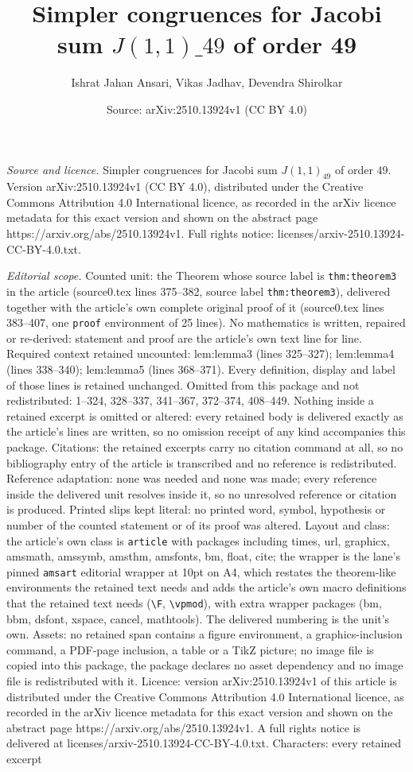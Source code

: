\documentclass[10pt,a4paper]{amsart}
\title[Simpler congruences for Jacobi sum $J(1, 1)\_{49}$ of order 4]{Simpler congruences for Jacobi sum $J(1, 1)\_{49}$ of order 49}
\author{Ishrat Jahan Ansari, Vikas Jadhav, Devendra Shirolkar}
\date{Source: arXiv:2510.13924v1 (CC BY 4.0)}
\begin{document}
\maketitle

\noindent\emph{Source and licence.} Simpler congruences for Jacobi sum $J(1, 1)_{49}$ of order 49. Version arXiv:2510.13924v1 (CC BY 4.0), distributed under the Creative Commons Attribution 4.0 International licence, as recorded in the arXiv licence metadata for this exact version and shown on the abstract page https://arxiv.org/abs/2510.13924v1. Full rights notice: licenses/arxiv-2510.13924-CC-BY-4.0.txt.\par\smallskip

\noindent\textit{Editorial scope.} Counted unit: the Theorem whose source label is \texttt{thm:theorem3} in the article (source0.tex lines 375--382, source label \texttt{thm:theorem3}), delivered together with the article's own complete original proof of it (source0.tex lines 383--407, one \texttt{proof} environment of 25 lines). No mathematics is written, repaired or re-derived: statement and proof are the article's own text line for line. Required context retained uncounted: lem:lemma3 (lines 325--327); lem:lemma4 (lines 338--340); lem:lemma5 (lines 368--371). Every definition, display and label of those lines is retained unchanged. Omitted from this package and not redistributed: 1--324, 328--337, 341--367, 372--374, 408--449. Nothing inside a retained excerpt is omitted or altered: every retained body is delivered exactly as the article's lines are written, so no omission receipt of any kind accompanies this package. Citations: the retained excerpts carry no citation command at all, so no bibliography entry of the article is transcribed and no reference is redistributed. Reference adaptation: none was needed and none was made; every reference inside the delivered unit resolves inside it, so no unresolved reference or citation is produced. Printed slips kept literal: no printed word, symbol, hypothesis or number of the counted statement or of its proof was altered. Layout and class: the article's own class is \texttt{article} with packages including times, url, graphicx, amsmath, amssymb, amsthm, amsfonts, bm, float, cite; the wrapper is the lane's pinned \texttt{amsart} editorial wrapper at 10pt on A4, which restates the theorem-like environments the retained text needs and adds the article's own macro definitions that the retained text needs (\texttt{\textbackslash F}, \texttt{\textbackslash vpmod}), with extra wrapper packages (bm, bbm, dsfont, xspace, cancel, mathtools). The delivered numbering is the unit's own. Assets: no retained span contains a figure environment, a graphics-inclusion command, a PDF-page inclusion, a table or a TikZ picture; no image file is copied into this package, the package declares no asset dependency and no image file is redistributed with it. Licence: version arXiv:2510.13924v1 of this article is distributed under the Creative Commons Attribution 4.0 International licence, as recorded in the arXiv licence metadata for this exact version and shown on the abstract page https://arxiv.org/abs/2510.13924v1. A full rights notice is delivered at licenses/arxiv-2510.13924-CC-BY-4.0.txt. Characters: every retained excerpt 
\end{document}
